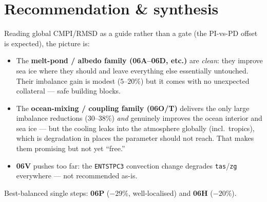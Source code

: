 \documentclass[10pt]{article}
\begin{document}
\section{Recommendation \& synthesis}\label{sec:rec}
Reading global CMPI/RMSD as a guide rather than a gate (the PI-vs-PD offset is expected), the picture is:
\begin{itemize}\itemsep1pt
\item The \textbf{melt-pond / albedo family (06A--06D, etc.)} are \emph{clean}: they improve sea ice where they
should and leave everything else essentially untouched. Their imbalance gain is modest ($5$--$20\%$) but it comes
with no unexpected collateral --- safe building blocks.
\item The \textbf{ocean-mixing / coupling family (06O/T)} delivers the only large imbalance reductions
($30$--$38\%$) \emph{and} genuinely improves the ocean interior and sea ice --- but the cooling leaks into the
atmosphere globally (incl.\ tropics), which is degradation in places the parameter should not reach. That makes
them promising but not yet ``free.''
\item \textbf{06V} pushes too far: the \texttt{ENTSTPC3} convection change degrades \texttt{tas}/\texttt{zg}
everywhere --- not recommended as-is.
\end{itemize}
Best-balanced single steps: \textbf{06P} ($-29\%$, well-localised) and \textbf{06H} ($-20\%$).
\end{document}
